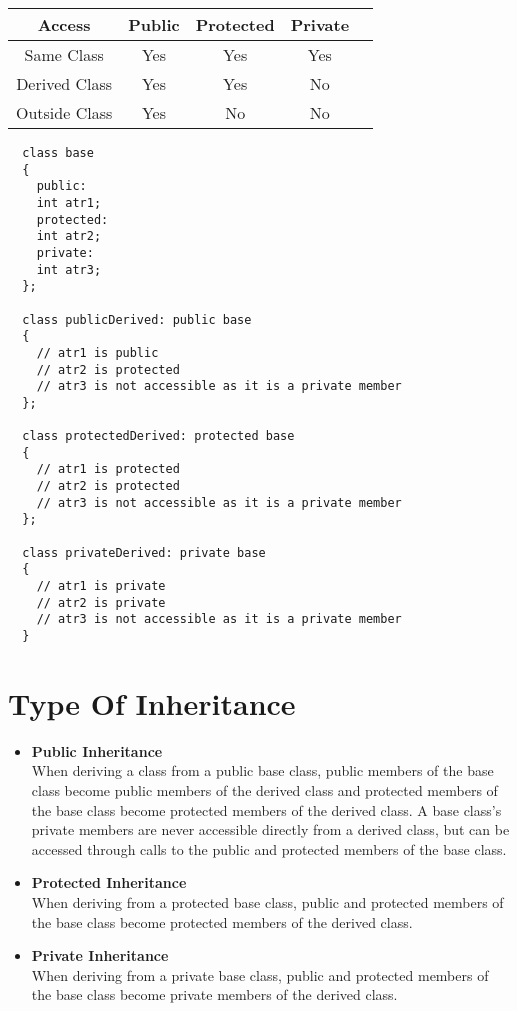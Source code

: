 \documentclass[11pt,fleqn]{book} %
\begin{document}
\begin{center}
  \begin{tabular}{ |c|c|c|c|c| } 
    \hline
    Access & Public & Protected & Private \\
    \hline
    Same Class & Yes & Yes & Yes \\ 
    Derived Class & Yes & Yes & No \\ 
    Outside Class & Yes & No & No \\ 
    \hline
  \end{tabular}
\end{center}
\begin{lstlisting}
  class base 
  {
    public:
    int atr1;
    protected:
    int atr2;
    private:
    int atr3;
  };

  class publicDerived: public base
  {
    // atr1 is public
    // atr2 is protected
    // atr3 is not accessible as it is a private member
  };

  class protectedDerived: protected base
  {
    // atr1 is protected
    // atr2 is protected
    // atr3 is not accessible as it is a private member
  };

  class privateDerived: private base
  {
    // atr1 is private
    // atr2 is private
    // atr3 is not accessible as it is a private member 
  }
\end{lstlisting}

\section{Type Of Inheritance}
\begin{itemize}
\item \textbf{Public Inheritance} \\
  When deriving a class from a public base class, public members of the base class become public members of the derived class and protected members of the base class become protected members of the derived class. A base class's private members are never accessible directly from a derived class, but can be accessed through calls to the public and protected members of the base class.\\
\item \textbf{Protected Inheritance} \\
  When deriving from a protected base class, public and protected members of the base class become protected members of the derived class.\\
\item \textbf{Private Inheritance} \\
  When deriving from a private base class, public and protected members of the base class become private members of the derived class. 
\end{itemize}
\end{document}
